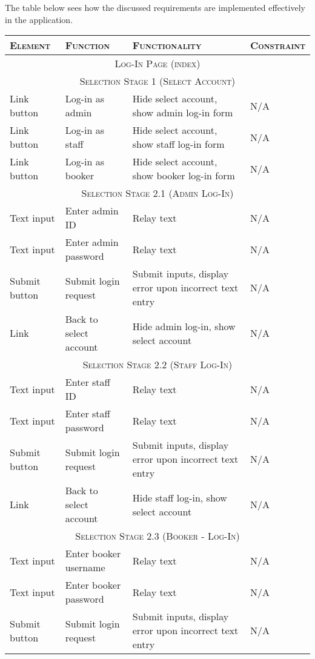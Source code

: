 \documentclass[11pt, english]{article}
\begin{document}
	The table below sees how the discussed requirements are implemented effectively in the application.

	\begin{center}
		\scriptsize
	\begin{longtable}{p{3cm}p{3cm}p{4cm}p{3cm}}
		\textsc{Element} & \textsc{Function} & \textsc{Functionality} & \textsc{Constraint}\\
		\hline
		\hline
		\multicolumn{4}{c}{\textsc{Log-In Page (index)}}\\
		\hline
		\hline
		\multicolumn{4}{c}{\textsc{Selection Stage 1 (Select Account)}}\\
		\hline
		Link button & Log-in as admin & Hide select account, show admin log-in form & N/A\\
		Link button & Log-in as staff & Hide select account, show staff log-in form & N/A\\
		Link button & Log-in as booker & Hide select account, show booker log-in form & N/A\\
		\hline
		\multicolumn{4}{c}{\textsc{Selection Stage 2.1 (Admin Log-In)}}\\
		\hline
		Text input & Enter admin ID & Relay text & N/A\\
		Text input & Enter admin password & Relay text & N/A\\
		Submit button & Submit login request & Submit inputs, display error upon incorrect text entry & N/A\\
		Link & Back to select account & Hide admin log-in, show select account & N/A\\
		\hline
		\multicolumn{4}{c}{\textsc{Selection Stage 2.2 (Staff Log-In)}}\\
		\hline
		Text input & Enter staff ID & Relay text & N/A\\
		Text input & Enter staff password & Relay text & N/A\\
		Submit button & Submit login request & Submit inputs, display error upon incorrect text entry & N/A\\
		Link & Back to select account & Hide staff log-in, show select account & N/A\\
		\hline
		\multicolumn{4}{c}{\textsc{Selection Stage 2.3 (Booker - Log-In)}}\\
		\hline
		Text input & Enter booker username & Relay text & N/A\\
		Text input & Enter booker password & Relay text & N/A\\
		Submit button & Submit login request & Submit inputs, display error upon incorrect text entry & N/A\\

\end{longtable}
\end{center}
\end{document}
